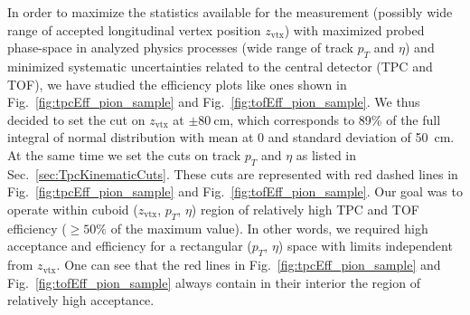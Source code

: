 In order to maximize the statistics available for the measurement (possibly wide range of accepted longitudinal vertex position $z_{\text{vtx}}$) with maximized probed phase-space in analyzed physics processes (wide range of track $p_{T}$ and $\eta$) and minimized systematic uncertainties related to the central detector (TPC and TOF), we have studied the efficiency plots like ones shown in Fig.~\ref{fig:tpcEff_pion_sample} and Fig.~\ref{fig:tofEff_pion_sample}. We thus decided to set the cut on $z_{\text{vtx}}$ at $\pm80~\text{cm}$, which corresponds to 89\% of the full integral of normal distribution with mean at 0 and standard deviation of 50~cm. At the same time we set the cuts on track $p_{T}$ and $\eta$ as listed in Sec.~\ref{sec:TpcKinematicCuts}. These cuts are represented with red dashed lines in Fig.~\ref{fig:tpcEff_pion_sample} and Fig.~\ref{fig:tofEff_pion_sample}. Our goal was to operate within cuboid ($z_{\text{vtx}}$, $p_{T}$, $\eta$) region of relatively high TPC and TOF efficiency ($\geq50\%$ of the maximum value). In other words, we required high acceptance and efficiency for a rectangular ($p_{T}$, $\eta$) space with limits independent from $z_{\text{vtx}}$. One can see that the red lines in Fig.~\ref{fig:tpcEff_pion_sample} and Fig.~\ref{fig:tofEff_pion_sample} always contain in their interior the region of relatively high acceptance.


